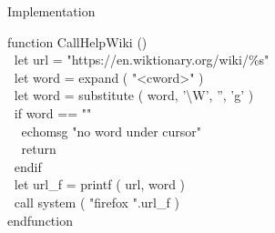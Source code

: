 \documentclass{beamer}
\newenvironment{mycode}[0]
{\ttfamily}
{}
\newcommand{\myind}[1]{\textcolor{white}{#1}}
\newcommand{\myident}[1]{\textcolor{identifier}{#1}}
\newcommand{\mykeywd}[1]{\textcolor{keyword}{#1}}
\newcommand{\mystring}[1]{\textcolor{string}{#1}}
\begin{document}
\begin{frame}{Implementation}{}

	\begin{mycode}
		\mykeywd{function} CallHelpWiki () \\[2mm]

			\myind{..}\mykeywd{let} url {} = \mystring{"https://en.wiktionary.org/wiki/\%s"} \\
			\myind{..}\mykeywd{let} word = \myident{expand} ( \mystring{"<cword>"} ) \\
			\myind{..}\mykeywd{let} word = \myident{substitute} ( word, \mystring{'\textbackslash{}W'}, \mystring{''}, \mystring{'g'} ) \\[2mm]

			\myind{..}\mykeywd{if} word == \mystring{""} \\
			\myind{..}\myind{..}\mykeywd{echomsg} \mystring{"no word under cursor"} \\
			\myind{..}\myind{..}\mykeywd{return} \\
			\myind{..}\mykeywd{endif} \\[2mm]

			\myind{..}\mykeywd{let} url\_f = \myident{printf} ( url, word ) \\
			\myind{..}\mykeywd{call} \myident{system} ( \mystring{"firefox "}.url\_f ) \\
		\mykeywd{endfunction} \\
	\end{mycode}

\end{frame}
\end{document}
